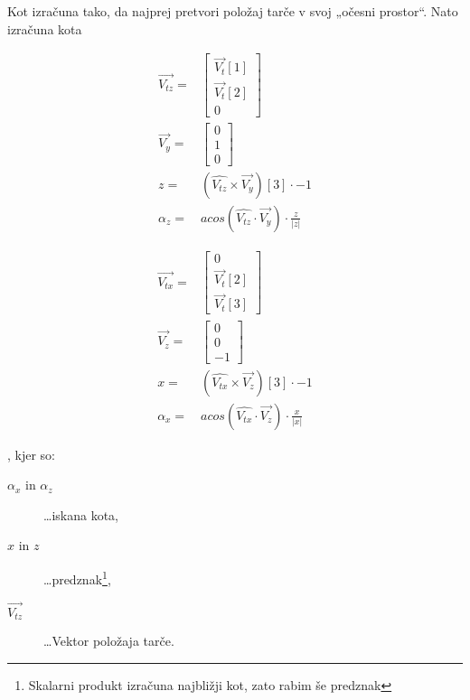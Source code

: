 \documentclass[a4paper]{article}
\begin{document}
Kot izračuna tako, da najprej pretvori položaj tarče v svoj „očesni prostor“. Nato izračuna kota\\
\begin{minipage}{0.5\textwidth}
\begin{eqnarray*}
  \overrightarrow{V_{tz}} =& \left[\begin{array}{c}\overrightarrow{V_t}[1]\\\overrightarrow{V_t}[2]\\0\end{array}\right]\\
  \overrightarrow{V_y} =& \left[\begin{array}{c}0\\1\\0\end{array}\right]\\
  z =& (\widehat{V_{tz}} \times \overrightarrow{V_y})[3] \cdot -1\\
  \alpha_z =& acos\left(\widehat{V_{tz}} \cdot \overrightarrow{V_y}\right) \cdot \frac{z}{|z|}
\end{eqnarray*}
\end{minipage}
\begin{minipage}{0.5\textwidth}
\begin{eqnarray*}
  \overrightarrow{V_{tx}} =& \left[\begin{array}{c}0\\\overrightarrow{V_t}[2]\\\overrightarrow{V_t}[3]\end{array}\right]\\
  \overrightarrow{V_z} =& \left[\begin{array}{c}0\\0\\-1\end{array}\right]\\
  x =& (\widehat{V_{tx}} \times \overrightarrow{V_z})[3] \cdot -1\\
  \alpha_x =& acos\left(\widehat{V_{tx}} \cdot \overrightarrow{V_z}\right) \cdot \frac{x}{|x|}
\end{eqnarray*}
\end{minipage}
, kjer so:
\begin{description}
  \item[$\alpha_x$ in $\alpha_z$] \dots iskana kota,
  \item[$x$ in $z$] \dots predznak\footnote{Skalarni produkt izračuna najbližji kot, zato rabim še predznak},
  \item[$\overrightarrow{V_{tz}}$] \dots Vektor položaja tarče.
\end{description}
\end{document}
